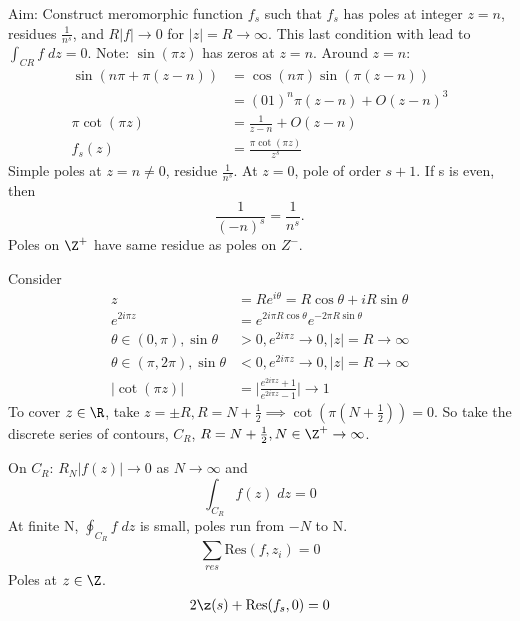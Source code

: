 \documentclass[a4paper, 11pt, normalem]{report}
\begin{document}
Aim: Construct meromorphic function $f_s$ such that $f_s$ has poles at integer $z = n$, residues $\frac{1}{n^s}$, and $R|f| \to 0$ for $|z| = R \to \infty$.
This last condition with lead to $\int_{CR} f\;dz = 0$.
Note: $\sin(\pi z)$ has zeros at $z = n$.
Around $z = n$:
\begin{align}
    \sin(n\pi + \pi(z-n)) &= \cos(n\pi)\sin(\pi(z-n)) \\
                          &= (01)^n\pi(z-n) + O(z-n)^3 \\
    \pi\cot(\pi z) &= \frac{1}{z-n} + O(z-n) \\
    f_s(z) &= \frac{\pi\cot(\pi z)}{z^s}
\end{align}
Simple poles at $z = n \neq 0$, residue $\frac{1}{n^s}$.
At $z = 0$, pole of order $s+1$. 
If s is even, then 
\begin{equation}
    \frac{1}{(-n)^s}  = \frac{1}{n^s}.
\end{equation}
Poles on $\Z^+$ have same residue as poles on $Z^-$.

Consider 
\begin{align}
    z &= Re^{i\theta} = R\cos\theta + iR\sin\theta \\
    e^{2i\pi z} &= e^{2i\pi R\cos\theta}e^{-2\pi R\sin\theta} \\
    \theta \in (0,\pi), \sin\theta &> 0, e^{2i\pi z} \to 0, |z| = R\to \infty \\
    \theta \in (\pi,2\pi), \sin\theta &< 0, e^{2i\pi z}\to 0, |z|=R\to\infty \\
    |\cot(\pi z)| &= \bigg|\frac{e^{2i\pi z}+1}{e^{2i\pi z} - 1}\bigg| \to 1
\end{align}
To cover $z \in \R$, take $z = \pm R, R = N + \frac{1}{2} \implies \cot(\pi(N+\frac{1}{2})) = 0$.
So take the discrete series of contours, $C_R$, $R = N + \frac{1}{2}, N \in \Z^+ \to \infty$. 

On $C_R$: $R_N|f(z)| \to 0$ as $N \to \infty$ and
\begin{equation}
    \int_{C_R} f(z)\;dz = 0
\end{equation}
At finite N, $\oint_{C_R} f\;dz$ is small, poles run from $-N$ to N.
\begin{equation}
    \sum_{res} \text{Res}(f,z_i) = 0
\end{equation}
Poles at $z \in \Z$. 
\begin{align}
    2\z(s) + \text{Res}(f_s,0) = 0
\end{align}
\end{document}
